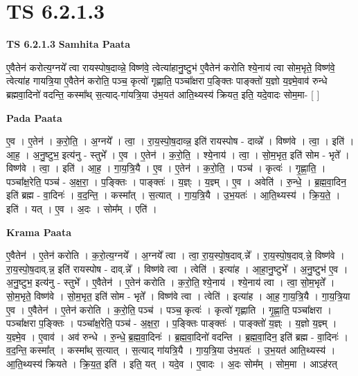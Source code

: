 \documentclass[17pt]{extarticle}
\begin{document}
\section{ TS 6.2.1.3 }

\textbf{TS 6.2.1.3 } \newline
\textbf{Samhita Paata} \newline

ए॒वैतेन॑ करोत्य॒ग्नये᳚ त्वा रायस्पोष॒दाव्न्ने॒ विष्ण॑वे॒ त्वेत्या॑हानु॒ष्टुभ॑ ए॒वैतेन॑ करोति श्ये॒नाय॑ त्वा सोम॒भृते॒ विष्ण॑वे॒ त्वेत्या॑ह गायत्रि॒या ए॒वैतेन॑ करोति॒ पञ्च॒ कृत्वो॑ गृह्णाति॒ पञ्चा᳚क्षरा प॒ङ्क्तिः पाङ्क्तो॑ य॒ज्ञो य॒ज्ञ्मे॒वाव॑ रुन्धे ब्रह्मवा॒दिनो॑ वदन्ति॒ कस्मा᳚थ् स॒त्याद्-गा॑यत्रि॒या उ॑भ॒यत॑ आति॒थ्यस्य॑ क्रियत॒ इति॒ यदे॒वादः सोम॒मा- [  ] \newline

\textbf{Pada Paata} \newline

ए॒व । ए॒तेन॑ । क॒रो॒ति॒ । अ॒ग्नये᳚ । त्वा॒ । रा॒य॒स्पो॒ष॒दाव्न्न॒ इति॑ रायस्पोष - दाव्न्ने᳚ । विष्ण॑वे । त्वा॒ । इति॑ । आ॒ह॒ । अ॒नु॒ष्टुभ॒ इत्य॑नु - स्तुभे᳚ । ए॒व । ए॒तेन॑ । क॒रो॒ति॒ । श्ये॒नाय॑ । त्वा॒ । सो॒म॒भृत॒ इति॑ सोम - भृते᳚ । विष्ण॑वे । त्वा॒ । इति॑ । आ॒ह॒ । गा॒य॒त्रि॒यै । ए॒व । ए॒तेन॑ । क॒रो॒ति॒ । पञ्च॑ । कृत्वः॑ । गृ॒ह्णा॒ति॒ । पञ्चा᳚क्ष॒रेति॒ पञ्च॑ - अ॒क्ष॒रा॒ । प॒ङ्क्तिः । पाङ्क्तः॑ । य॒ज्ञ्ः । य॒ज्ञ्म् । ए॒व । अवेति॑ । रु॒न्धे॒ । ब्र॒ह्म॒वा॒दिन॒ इति॑ ब्रह्म - वा॒दिनः॑ । व॒द॒न्ति॒ । कस्मा᳚त् । स॒त्यात् । गा॒य॒त्रि॒यै । उ॒भ॒यतः॑ । आ॒ति॒थ्यस्य॑ । क्रि॒य॒ते॒ । इति॑ । यत् । ए॒व । अ॒दः । सोम᳚म् । एति॑ ।  \newline


\textbf{Krama Paata} \newline

ए॒वैतेन॑ । ए॒तेन॑ करोति । क॒रो॒त्य॒ग्नये᳚ । अ॒ग्नये᳚ त्वा । त्वा॒ रा॒य॒स्पो॒ष॒दाव्.न्ने᳚ । रा॒य॒स्पो॒ष॒दाव्.न्ने॒ विष्ण॑वे । रा॒य॒स्पो॒ष॒दाव्.न्न॒ इति॑ रायस्पोष - दाव्.न्ने᳚ । विष्ण॑वे त्वा । त्वेति॑ । इत्या॑ह । आ॒हा॒नु॒ष्टुभे᳚ । अ॒नु॒ष्टुभ॑ ए॒व । अ॒नु॒ष्टुभ॒ इत्य॑नु - स्तुभे᳚ । ए॒वैतेन॑ । ए॒तेन॑ करोति । क॒रो॒ति॒ श्ये॒नाय॑ । श्ये॒नाय॑ त्वा । त्वा॒ सो॒म॒भृते᳚ । सो॒म॒भृते॒ विष्ण॑वे । सो॒म॒भृत॒ इति॑ सोम - भृते᳚ । विष्ण॑वे त्वा । त्वेति॑ । इत्या॑ह । आ॒ह॒ गा॒य॒त्रि॒यै । गा॒य॒त्रि॒या ए॒व । ए॒वैतेन॑ । ए॒तेन॑ करोति । क॒रो॒ति॒ पञ्च॑ । पञ्च॒ कृत्वः॑ । कृत्वो॑ गृह्णाति । गृ॒ह्णा॒ति॒ पञ्चा᳚क्षरा । पञ्चा᳚क्षरा प॒ङ्‍क्तिः । पञ्चा᳚क्ष॒रेति॒ पञ्च॑ - अ॒क्ष॒रा॒ । प॒ङ्‍क्तिः पाङ्‍क्तः॑ । पाङ्‍क्तो॑ य॒ज्ञ्ः । य॒ज्ञो य॒ज्ञ्म् । य॒ज्ञ्मे॒व । ए॒वाव॑ । अव॑ रुन्धे । रु॒न्धे॒ ब्र॒ह्म॒वा॒दिनः॑ । ब्र॒ह्म॒वा॒दिनो॑ वदन्ति । ब्र॒ह्म॒वा॒दिन॒ इति॑ ब्रह्म - वा॒दिनः॑ । व॒द॒न्ति॒ कस्मा᳚त् । कस्मा᳚थ् स॒त्यात् । स॒त्याद् गा॑यत्रि॒यै । गा॒य॒त्रि॒या उ॑भ॒यतः॑ । उ॒भ॒यत॑ आति॒थ्यस्य॑ । आ॒ति॒थ्यस्य॑ क्रियते । क्रि॒य॒त॒ इति॑ । इति॒ यत् । यदे॒व । ए॒वादः । अ॒दः सोम᳚म् । सोम॒मा । आऽह॑रत् \newline
\end{document}
